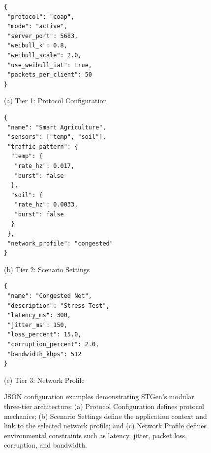 \documentclass[jsan,article,submit,moreauthors,pdftex]{Definitions/mdpi}
\begin{document}
\begin{figure}[H]
    \centering
    
    \begin{minipage}[b]{0.32\textwidth}
        \begin{lstlisting}[frame=single, basicstyle=\scriptsize\ttfamily, framesep=2pt, breaklines=true]
{
 "protocol": "coap",
 "mode": "active",
 "server_port": 5683,
 "weibull_k": 0.8,
 "weibull_scale": 2.0,
 "use_weibull_iat": true,
 "packets_per_client": 50
}
        \end{lstlisting}
        \vspace{2pt}
        \centering\footnotesize (a) Tier 1: Protocol Configuration
    \end{minipage}\hfill
    \begin{minipage}[b]{0.32\textwidth}
        \begin{lstlisting}[frame=single, basicstyle=\scriptsize\ttfamily, framesep=2pt, breaklines=true]
{
 "name": "Smart Agriculture",
 "sensors": ["temp", "soil"],
 "traffic_pattern": {
  "temp": {
   "rate_hz": 0.017,
   "burst": false
  },
  "soil": {
   "rate_hz": 0.0033,
   "burst": false
  }
 },
 "network_profile": "congested"
}
        \end{lstlisting}
        \vspace{2pt}
        \centering\footnotesize (b) Tier 2: Scenario Settings
    \end{minipage}\hfill
    \begin{minipage}[b]{0.32\textwidth}
        \begin{lstlisting}[frame=single, basicstyle=\scriptsize\ttfamily, framesep=2pt, breaklines=true]
{
 "name": "Congested Net",
 "description": "Stress Test",
 "latency_ms": 300,
 "jitter_ms": 150,
 "loss_percent": 15.0,
 "corruption_percent": 2.0,
 "bandwidth_kbps": 512
}
        \end{lstlisting}
        \vspace{2pt}
        \centering\footnotesize (c) Tier 3: Network Profile
    \end{minipage}
    
    \caption{JSON configuration examples demonstrating STGen’s modular three-tier architecture: (a) Protocol Configuration defines protocol mechanics; (b) Scenario Settings define the application context and link to the selected network profile; and (c) Network Profile defines environmental constraints such as latency, jitter, packet loss, corruption, and bandwidth.}
    \label{fig:config_tiers}
\end{figure}
\end{document}

